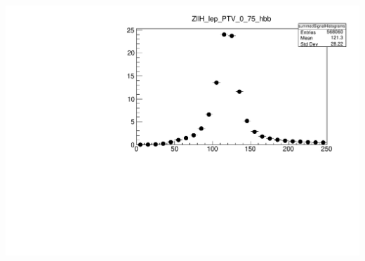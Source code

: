\documentclass{beamer}
\newcommand{\beginbackup}{
  \newcounter{framenumbervorappendix}
  \setcounter{framenumbervorappendix}{\value{framenumber}}
}
\newcommand{\backupend}{
  \addtocounter{framenumbervorappendix}{-\value{framenumber}}
  \addtocounter{framenumber}{\value{framenumbervorappendix}}
}
\begin{document}
\begin{frame}
\begin{columns}
\begin{column}{0.33\linewidth}
      \includegraphics[width=\linewidth]{figs/kinfit.pdf}
    \end{column}
  \end{columns}

\end{frame}

\end{document}
